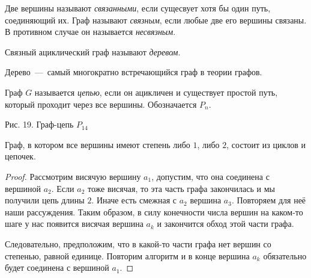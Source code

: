 \begin{definition}
	Две вершины называют \emph{связанными}, если сущесвует хотя бы один путь, соединяющий их. Граф называют \emph{связным}, если любые две его вершины связаны. В противном случае он называется \emph{несвязным}.
\end{definition}

\begin{definition}
	Связный ациклический граф называют \emph{деревом}.
\end{definition}

	Дерево~---~самый многократно встречающийся граф в теории графов. 
	
\begin{definition}
	Граф $G$ называется \emph{цепью}, если он ацикличен и существует простой путь, который проходит через все вершины. Обозначается $P_n$.
\end{definition}

\begin{center}
\newline
\newline
	\small Рис. 19. Граф-цепь $P_14$
\end{center}

\begin{statement}
	Граф, в котором все вершины имеют степень либо $1$, либо $2$, состоит из циклов и цепочек.

\begin{proof}
	Рассмотрим висячую вершину $a_1$, допустим, что она соединена с вершиной $a_2$. Если $a_2$ тоже висячая, то эта часть графа закончилась и мы получили цепь длины $2$. Иначе есть смежная с $a_2$ вершина $a_3$. Повторяем для неё наши рассуждения. Таким образом, в силу конечности числа вершин на каком-то шаге у нас появится висячая вершина $a_k$ и закончится обход этой части графа.
	
	 Следовательно, предположим, что в какой-то части графа нет вершин со степенью, равной единице. Повторим алгоритм и в конце вершина $a_k$ обязательно будет соединена с вершиной $a_1$.
\end{proof}
\end{statement}

